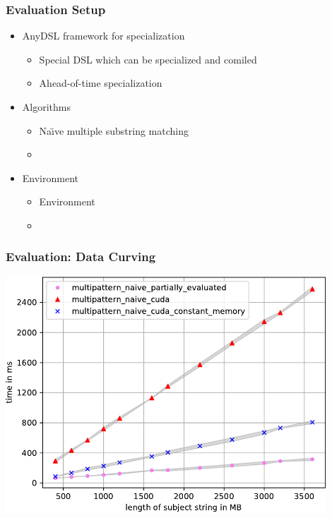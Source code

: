 \documentclass[xcolor=table]{beamer}
\begin{document}
\begin{frame}[fragile] \frametitle{Evaluation Setup}
  \begin{itemize}
    \item AnyDSL framework for specialization
    \begin{itemize}
      \item Special DSL which can be specialized and comiled
      \item Ahead-of-time specialization
    \end{itemize}
    \pause
    \item Algorithms
    \begin{itemize}
      \item Na\"{\i}ve multiple substring matching
      \item
    \end{itemize}
    \pause
    \item Environment
    \begin{itemize}
      \item Environment
      \item
    \end{itemize}

  \end{itemize}
\end{frame}


\begin{frame}[fragile] \frametitle{Evaluation: Data Curving}
  {\includegraphics[width=0.9\textwidth]{pictures/results.pdf}}
\end{frame}
\end{document}

